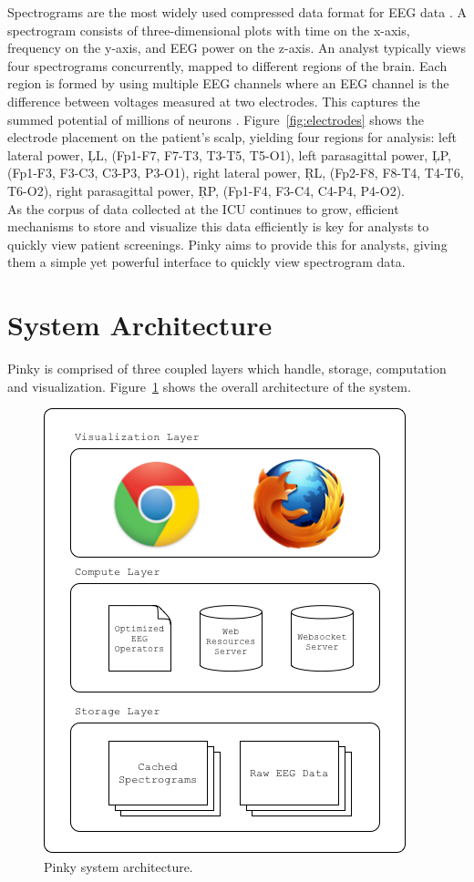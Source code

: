 Spectrograms are the most widely used compressed data format for EEG data
\cite{ceeg-1}. A spectrogram consists of three-dimensional plots with time on
the x-axis, frequency on the y-axis, and EEG power on the z-axis. An analyst
typically views four spectrograms concurrently, mapped to different regions of
the brain. Each region is formed by using multiple EEG channels where an EEG
channel is the difference between voltages measured at two electrodes. This
captures the summed potential of millions of neurons \cite{eeg-ml}.
Figure~\ref{fig:electrodes} shows the electrode placement on the patient's
scalp, yielding four regions for analysis: left lateral power, \c{LL}, (Fp1-F7,
F7-T3, T3-T5, T5-O1), left parasagittal power, \c{LP}, (Fp1-F3, F3-C3, C3-P3,
P3-O1), right lateral power, \c{RL}, (Fp2-F8, F8-T4, T4-T6, T6-O2), right
parasagittal power, \c{RP}, (Fp1-F4, F3-C4, C4-P4, P4-O2).  \\

As the corpus of data collected at the ICU continues to grow, efficient
mechanisms to store and visualize this data efficiently is key for analysts to
quickly view patient screenings. Pinky aims to provide this for analysts,
giving them a simple yet powerful interface to quickly view spectrogram data.

\section{System Architecture}

Pinky is comprised of three coupled layers which handle, storage, computation
and visualization. Figure~\ref{fig:system-architecture} shows the overall
architecture of the system.

\begin{figure}[h]
\begin{center}
\includegraphics[scale=0.75]{./img/system-architecture.png}
\caption{Pinky system architecture.}
\label{fig:system-architecture}
\end{center}
\end{figure}

